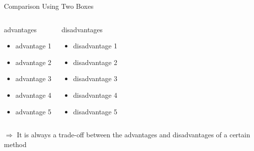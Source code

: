 \documentclass[english,american,german,aspectratio=169]{beamer}
\begin{document}
\begin{frame}{Comparison Using Two Boxes}

  \begin{columns}[t]

    \begin{exampleblock}{advantages \cite{IEEE:15/0609r2}}

      \begin{itemize}
        \item advantage 1
        \item advantage 2
        \item advantage 3
        \item advantage 4
        \item advantage 5
      \end{itemize}
    \end{exampleblock}


    \begin{alertblock}{disadvantages}

      \begin{itemize}
        \item disadvantage 1
        \item disadvantage 2
        \item disadvantage 3
        \item disadvantage 4
        \item disadvantage 5
      \end{itemize}
    \end{alertblock}
  \end{columns}

  \bigskip{}

  $\mathit{\Longrightarrow}$ It is always a trade-off between the advantages
  and disadvantages of a certain method \cite{Jones:2015}
\end{frame}
\end{document}
